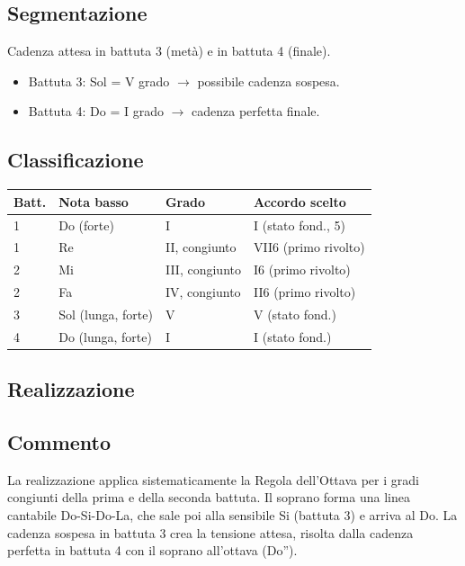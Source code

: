 \subsection{Segmentazione}

Cadenza attesa in battuta 3 (metà) e in battuta 4 (finale).
\begin{itemize}
	\item Battuta 3: Sol = V grado $\rightarrow$ possibile cadenza sospesa.
	\item Battuta 4: Do = I grado $\rightarrow$ cadenza perfetta finale.
\end{itemize}

\subsection{Classificazione}

\begin{center}
\begin{tabular}{|l|l|l|l|}
\hline
\textbf{Batt.} & \textbf{Nota basso} & \textbf{Grado} & \textbf{Accordo scelto} \\
\hline
1 & Do (forte) & I & I (stato fond., 5) \\
1 & Re & II, congiunto & VII6 (primo rivolto) \\
2 & Mi & III, congiunto & I6 (primo rivolto) \\
2 & Fa & IV, congiunto & II6 (primo rivolto) \\
3 & Sol (lunga, forte) & V & V (stato fond.) \\
4 & Do (lunga, forte) & I & I (stato fond.) \\
\hline
\end{tabular}
\end{center}

\subsection{Realizzazione}


\subsection{Commento}

La realizzazione applica sistematicamente la Regola dell'Ottava per i gradi congiunti della prima e della seconda battuta. Il soprano forma una linea cantabile Do-Si-Do-La, che sale poi alla sensibile Si (battuta 3) e arriva al Do. La cadenza sospesa in battuta 3 crea la tensione attesa, risolta dalla cadenza perfetta in battuta 4 con il soprano all'ottava (Do'').

